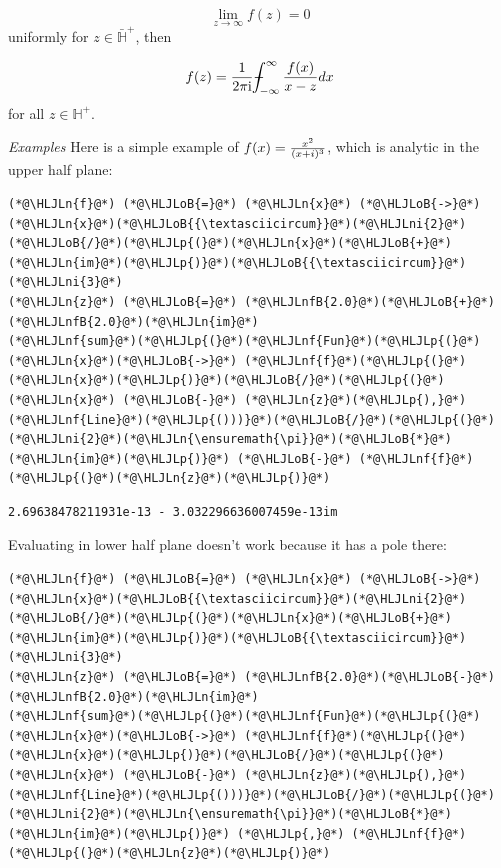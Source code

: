 \documentclass[12pt,a4paper]{article}
\newcommand{\HLJLn}[1]{#1}
\newcommand{\HLJLnf}[1]{\textcolor[RGB]{66,102,213}{#1}}
\newcommand{\HLJLnfB}[1]{\textcolor[RGB]{59,151,46}{#1}}
\newcommand{\HLJLni}[1]{\textcolor[RGB]{59,151,46}{#1}}
\newcommand{\HLJLoB}[1]{\textcolor[RGB]{102,102,102}{\textbf{#1}}}
\newcommand{\HLJLp}[1]{#1}
\def\I{ {\rm i} }
\def\Xint#1{ \mathchoice
   {\XXint\displaystyle\textstyle{#1} }%
   {\XXint\textstyle\scriptstyle{#1} }%
   {\XXint\scriptstyle\scriptscriptstyle{#1} }%
   {\XXint\scriptscriptstyle\scriptscriptstyle{#1} }%
   \!\int}
\def\XXint#1#2#3{ {\setbox0=\hbox{$#1{#2#3}{\int}$}
     \vcenter{\hbox{$#2#3$}}\kern-.5\wd0} }
\def\dashint{\Xint-}
\def\infdashint{\dashint_{-\infty}^\infty}
\begin{document}
\[
\lim_{z \rightarrow \infty} f(z) = 0
\]
uniformly for $z \in \bar {\mathbb H}^+$, then

\[
f(z) = {1 \over 2 \pi \I} \infdashint {f(x) \over x - z} dx
\]
for all  $z \in {\mathbb H}^+$.

\emph{Examples} Here is a simple example of $f(x) = {x^2 \over (x+ i)^3}$, which is analytic in the upper half plane:


\begin{lstlisting}
(*@\HLJLn{f}@*) (*@\HLJLoB{=}@*) (*@\HLJLn{x}@*) (*@\HLJLoB{->}@*) (*@\HLJLn{x}@*)(*@\HLJLoB{{\textasciicircum}}@*)(*@\HLJLni{2}@*)(*@\HLJLoB{/}@*)(*@\HLJLp{(}@*)(*@\HLJLn{x}@*)(*@\HLJLoB{+}@*)(*@\HLJLn{im}@*)(*@\HLJLp{)}@*)(*@\HLJLoB{{\textasciicircum}}@*)(*@\HLJLni{3}@*)
(*@\HLJLn{z}@*) (*@\HLJLoB{=}@*) (*@\HLJLnfB{2.0}@*)(*@\HLJLoB{+}@*)(*@\HLJLnfB{2.0}@*)(*@\HLJLn{im}@*)
(*@\HLJLnf{sum}@*)(*@\HLJLp{(}@*)(*@\HLJLnf{Fun}@*)(*@\HLJLp{(}@*)(*@\HLJLn{x}@*)(*@\HLJLoB{->}@*) (*@\HLJLnf{f}@*)(*@\HLJLp{(}@*)(*@\HLJLn{x}@*)(*@\HLJLp{)}@*)(*@\HLJLoB{/}@*)(*@\HLJLp{(}@*)(*@\HLJLn{x}@*) (*@\HLJLoB{-}@*) (*@\HLJLn{z}@*)(*@\HLJLp{),}@*) (*@\HLJLnf{Line}@*)(*@\HLJLp{()))}@*)(*@\HLJLoB{/}@*)(*@\HLJLp{(}@*)(*@\HLJLni{2}@*)(*@\HLJLn{\ensuremath{\pi}}@*)(*@\HLJLoB{*}@*)(*@\HLJLn{im}@*)(*@\HLJLp{)}@*) (*@\HLJLoB{-}@*) (*@\HLJLnf{f}@*)(*@\HLJLp{(}@*)(*@\HLJLn{z}@*)(*@\HLJLp{)}@*)
\end{lstlisting}

\begin{lstlisting}
2.69638478211931e-13 - 3.032296636007459e-13im
\end{lstlisting}


Evaluating in lower half plane doesn't work because it has a pole there:


\begin{lstlisting}
(*@\HLJLn{f}@*) (*@\HLJLoB{=}@*) (*@\HLJLn{x}@*) (*@\HLJLoB{->}@*) (*@\HLJLn{x}@*)(*@\HLJLoB{{\textasciicircum}}@*)(*@\HLJLni{2}@*)(*@\HLJLoB{/}@*)(*@\HLJLp{(}@*)(*@\HLJLn{x}@*)(*@\HLJLoB{+}@*)(*@\HLJLn{im}@*)(*@\HLJLp{)}@*)(*@\HLJLoB{{\textasciicircum}}@*)(*@\HLJLni{3}@*)
(*@\HLJLn{z}@*) (*@\HLJLoB{=}@*) (*@\HLJLnfB{2.0}@*)(*@\HLJLoB{-}@*)(*@\HLJLnfB{2.0}@*)(*@\HLJLn{im}@*)
(*@\HLJLnf{sum}@*)(*@\HLJLp{(}@*)(*@\HLJLnf{Fun}@*)(*@\HLJLp{(}@*)(*@\HLJLn{x}@*)(*@\HLJLoB{->}@*) (*@\HLJLnf{f}@*)(*@\HLJLp{(}@*)(*@\HLJLn{x}@*)(*@\HLJLp{)}@*)(*@\HLJLoB{/}@*)(*@\HLJLp{(}@*)(*@\HLJLn{x}@*) (*@\HLJLoB{-}@*) (*@\HLJLn{z}@*)(*@\HLJLp{),}@*) (*@\HLJLnf{Line}@*)(*@\HLJLp{()))}@*)(*@\HLJLoB{/}@*)(*@\HLJLp{(}@*)(*@\HLJLni{2}@*)(*@\HLJLn{\ensuremath{\pi}}@*)(*@\HLJLoB{*}@*)(*@\HLJLn{im}@*)(*@\HLJLp{)}@*) (*@\HLJLp{,}@*) (*@\HLJLnf{f}@*)(*@\HLJLp{(}@*)(*@\HLJLn{z}@*)(*@\HLJLp{)}@*)
\end{lstlisting}
\end{document}
